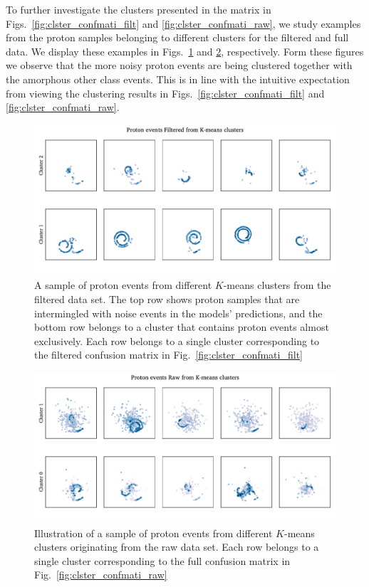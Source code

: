 \documentclass[review,sort&compress]{elsarticle}
\begin{document}
To further investigate the clusters presented in the matrix in Figs.~\ref{fig:clster_confmati_filt} and \ref{fig:clster_confmati_raw}, we study examples from the proton samples belonging to different clusters for the filtered and full data.
We display these examples in Figs.~\ref{fig:filtered_vgg_clster_repr} and \ref{fig:full_vgg_clster_repr}, respectively. Form these figures we observe that the more noisy proton events are being clustered together with the amorphous other class events. This is in line with the intuitive expectation from viewing the clustering results in Figs.~\ref{fig:clster_confmati_filt} and \ref{fig:clster_confmati_raw}.

\begin{figure}
\includegraphics[width=\textwidth]{custom_work/Filteredexamples.pdf}
\caption[Filtered proton samples by cluster belonging]{A sample of proton events from different $K$-means clusters from the filtered data set. The top row shows proton samples that are intermingled with noise events in the models' predictions, and the bottom row belongs to a cluster that contains proton events almost exclusively. Each row belongs to a single cluster corresponding to the filtered confusion matrix in Fig.~\ref{fig:clster_confmati_filt}}\label{fig:filtered_vgg_clster_repr}
\end{figure} 

\begin{figure}
\includegraphics[width=\textwidth]{custom_work/Rawexamples.pdf}
\caption[Full proton samples by cluster belonging]{Illustration of  a sample of proton events from different $K$-means clusters originating from the raw data set. Each row belongs to a single cluster corresponding to the full confusion matrix in Fig.~\ref{fig:clster_confmati_raw}}\label{fig:full_vgg_clster_repr}
\end{figure} 
\end{document}
